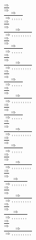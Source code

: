 \documentclass[11pt]{article}
\begin{document}
\begin{center}
\bigskip
\\$\frac{\Rightarrow }{\Rightarrow }$
\bigskip
\\$\frac{\Rightarrow }{\Rightarrow , , , , , }$
\bigskip
\\$\frac{\Rightarrow }{\Rightarrow }$
\bigskip
\\$\frac{\Rightarrow }{\Rightarrow , , , , , , , , , }$
\bigskip
\\$\frac{\Rightarrow }{\Rightarrow }$
\bigskip
\\$\frac{\Rightarrow }{\Rightarrow , , , , , }$
\bigskip
\\$\frac{\Rightarrow }{\Rightarrow }$
\bigskip
\\$\frac{\Rightarrow }{\Rightarrow , , , , , , , , , }$
\bigskip
\\$\frac{\Rightarrow }{\Rightarrow }$
\bigskip
\\$\frac{\Rightarrow }{\Rightarrow , , , , , }$
\bigskip
\\$\frac{\Rightarrow }{\Rightarrow }$
\bigskip
\\$\frac{\Rightarrow }{\Rightarrow , , , , , , , , , }$
\bigskip
\\$\frac{\Rightarrow }{\Rightarrow }$
\bigskip
\\$\frac{\Rightarrow }{\Rightarrow , , , , , }$
\bigskip
\\$\frac{\Rightarrow }{\Rightarrow }$
\bigskip
\\$\frac{\Rightarrow }{\Rightarrow , , , , , , , , , }$
\bigskip
\\$\frac{\Rightarrow }{\Rightarrow }$
\bigskip
\\$\frac{\Rightarrow }{\Rightarrow , , , , , }$
\bigskip
\\$\frac{\Rightarrow }{\Rightarrow }$
\bigskip
\\$\frac{\Rightarrow }{\Rightarrow , , , , , , , , , }$
\bigskip
\\$\frac{\Rightarrow }{\Rightarrow }$
\bigskip
\\$\frac{\Rightarrow }{\Rightarrow , , , , , , , }$
\bigskip
\\$\frac{\Rightarrow }{\Rightarrow }$
\bigskip
\\$\frac{\Rightarrow }{\Rightarrow , , , , , , , , , }$
\bigskip
\\$\frac{\Rightarrow }{\Rightarrow }$
\bigskip
\\$\frac{\Rightarrow }{\Rightarrow , , , , , , , }$
\bigskip
\\$\frac{\Rightarrow }{\Rightarrow }$
\bigskip
\\$\frac{\Rightarrow }{\Rightarrow , , , , , , , , , }$

\end{center}
\end{document}
